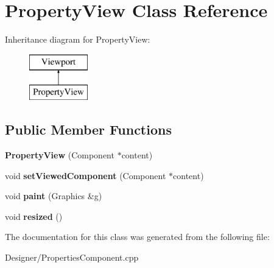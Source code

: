 \hypertarget{class_property_view}{\section{Property\-View Class Reference}
\label{class_property_view}
}
Inheritance diagram for Property\-View\-:\begin{figure}[H]
\begin{center}
\leavevmode
\includegraphics[height=2.000000cm]{class_property_view}
\end{center}
\end{figure}
\subsection*{Public Member Functions}
\begin{DoxyCompactItemize}
\item 
\hypertarget{class_property_view_af0d12aebca62216edcedcff29e83cf74}{{\bfseries Property\-View} (Component $\ast$content)}\label{class_property_view_af0d12aebca62216edcedcff29e83cf74}

\item 
\hypertarget{class_property_view_a91a0862621a5f073b4e280bd3d1286ba}{void {\bfseries set\-Viewed\-Component} (Component $\ast$content)}\label{class_property_view_a91a0862621a5f073b4e280bd3d1286ba}

\item 
\hypertarget{class_property_view_a51c887a8a5c32b0c6dc6f42c23576c06}{void {\bfseries paint} (Graphics \&g)}\label{class_property_view_a51c887a8a5c32b0c6dc6f42c23576c06}

\item 
\hypertarget{class_property_view_aa59022f09d173dbe026187e243768207}{void {\bfseries resized} ()}\label{class_property_view_aa59022f09d173dbe026187e243768207}

\end{DoxyCompactItemize}


The documentation for this class was generated from the following file\-:\begin{DoxyCompactItemize}
\item 
Designer/Properties\-Component.\-cpp\end{DoxyCompactItemize}
